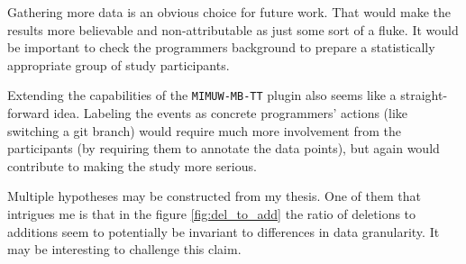 Gathering more data is an obvious choice for future work. That would make the results more believable and non-attributable as just some sort of a fluke. It would be important to check the programmers background to prepare a statistically appropriate group of study participants.

Extending the capabilities of the \texttt{MIMUW-MB-TT} plugin also seems like a straight-forward idea. Labeling the events as concrete programmers' actions (like switching a git branch) would require much more involvement from the participants (by requiring them to annotate the data points), but again would contribute to making the study more serious.

Multiple hypotheses may be constructed from my thesis. One of them that intrigues me is that in the figure \ref{fig:del_to_add} the ratio of deletions to additions seem to potentially be invariant to differences in data granularity. It may be interesting to challenge this claim.
